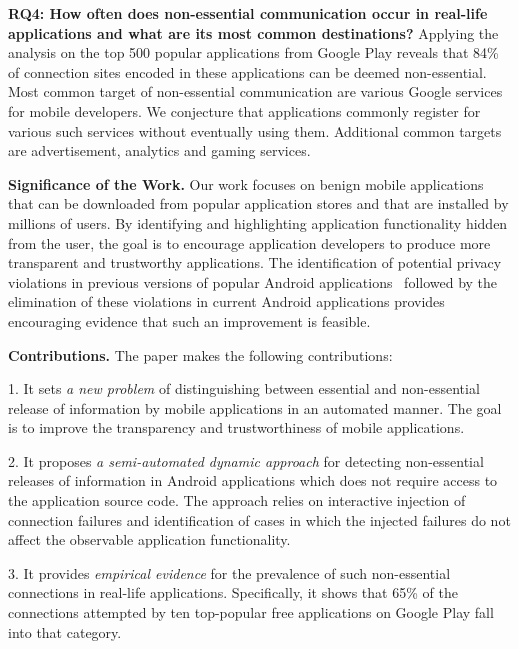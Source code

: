 \vspace{0.1in}
\noindent 
{\bf RQ4: How often does non-essential communication occur in real-life applications and what are its most common destinations?}
Applying the analysis on the top 500 popular applications from Google Play reveals that 84\% of connection sites encoded in these applications can be deemed non-essential.
Most common target of non-essential communication are various Google services for mobile developers. We conjecture 
that applications commonly register for various such services without eventually using them. 
Additional common targets are advertisement, analytics and gaming services. 

\vspace{0.1in}
\noindent 
{\bf Significance of the Work.}  Our work focuses on benign mobile
applications that can be downloaded from popular application stores
and that are installed by millions of users.  By identifying and
highlighting application functionality hidden from the user, the goal
is to encourage application developers to produce more transparent and
trustworthy applications. The identification of potential privacy
violations in previous versions of popular Android
applications~\cite{Enck:Gilbert:Chun:Cox:Jung:McDaniel:Sheth:OSDI10,Egele:Kruegel:Kirda:Vign:NDSS11,Tripp:Rubin:SEC14} followed by the
elimination of these violations in current Android applications
provides encouraging evidence that such an improvement is feasible.

\vspace{0.1in}
\noindent 
{\bf Contributions.}
The paper makes the following contributions:

1.
It sets \emph{a new problem} of distinguishing between essential and non-essential release of information by mobile applications in an automated manner. The goal is to improve the
transparency and trustworthiness of mobile applications.

\vspace{0.05in}
2.
It proposes \emph{a semi-automated dynamic approach} for detecting non-essential releases of information in Android applications which does not require access to the application source code. 
The approach relies on interactive injection of connection failures and identification of cases in which the injected failures do not affect the observable application functionality. 

\vspace{0.05in}
3.
It provides \emph{empirical evidence} for the prevalence of such non-essential connections in real-life applications. Specifically, it shows that 65\% of the connections attempted by ten top-popular free applications on Google Play fall into that category.    

